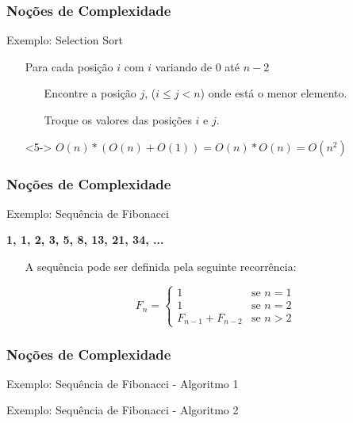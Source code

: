 \begin{frame}
\frametitle{Noções de Complexidade}
\begin{block}{Exemplo: Selection Sort}

\begin{itemize}
	\item[] Para cada posição $i$ com $i$ variando de $0$ até $n-2$ \uncover<4->{$O(n)$}
	\begin{itemize}
		\item[] Encontre a posição $j$, ($i \leq j < n$) onde está o menor elemento. \uncover<3->{$O(n)$}
		\item[] Troque os valores das posições $i$ e $j$. \uncover<2->{$O(1)$}
	\end{itemize}
	\item[]<5-> $O(n) * (O(n) + O(1)) = O(n) * O(n) = O(n^2)$
\end{itemize}
\end{block}
\end{frame}

\begin{frame}
\frametitle{Noções de Complexidade}

\begin{block}{Exemplo: Sequência de Fibonacci}
\begin{center}\textbf{1, 1, 2, 3, 5, 8, 13, 21, 34, ...}\end{center}
\begin{itemize}
	\item[] A sequência pode ser definida pela seguinte recorrência:
	\item[] $$F_n = \begin{cases}
					1&\text{se } n=1\\
					1&\text{se } n=2\\
					F_{n-1}+F_{n-2}&\text{se } n>2
				\end{cases}$$
\end{itemize}
\end{block}
\end{frame}

\begin{frame}
\frametitle{Noções de Complexidade}

\begin{block}{Exemplo: Sequência de Fibonacci - Algoritmo 1}
\end{block}

\begin{block}{Exemplo: Sequência de Fibonacci - Algoritmo 2}
\end{block}
\end{frame}


